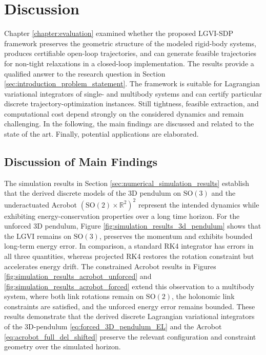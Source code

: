 \chapter{Discussion}
\label{chap:discussion}

Chapter \ref{chapter:evaluation} examined whether the proposed LGVI-SDP framework 
preserves the geometric structure
of the modeled rigid-body systems,
produces certifiable open-loop trajectories,
and can generate feasible trajectories for non-tight relaxations in a closed-loop implementation.
The results provide a qualified answer to the research question in Section \ref{sec:introduction_problem_statement}.
The framework is suitable for Lagrangian variational integrators of single- and multibody systems
and can certify particular discrete trajectory-optimization instances.
Still tightness, feasible extraction,
and computational cost depend strongly on the considered dynamics and remain challenging.
In the following, the main findings are discussed and related to the state of the art.
Finally, potential applications are elaborated.

\section{Discussion of Main Findings}
\label{sec:discussion_of_main_findings}
The simulation results in Section \ref{sec:numerical_simulation_results} 
establish that the derived discrete models of the 
3D pendulum on $\mathrm{SO}(3)$ and the underactuated Acrobot $(\mathrm{SO}(2) \times \mathbb{R}^2)^2$
represent the intended dynamics while exhibiting energy-conservation properties over a long time horizon.
For the unforced 3D pendulum,
Figure \ref{fig:simulation_results_3d_pendulum} shows that the LGVI remains on $\mathrm{SO}(3)$,
preserves the momentum
and exhibits bounded long-term energy error.
In comparison, a standard RK4 integrator has errors in all three quantities,
whereas projected RK4 restores the rotation constraint but accelerates energy drift.
The constrained Acrobot results in Figures \ref{fig:simulation_results_acrobot_unforced} 
and \ref{fig:simulation_results_acrobot_forced} extend this observation to a multibody system,
where both link rotations remain on $\mathrm{SO}(2)$,
the holonomic link constraints are satisfied,
and the unforced energy error remains bounded.
These results demonstrate that the derived discrete Lagrangian variational 
integrators of the 3D-pendulum \eqref{eq:forced_3D_pendulum_EL} and the 
Acrobot \eqref{eq:acrobot_full_del_shifted} preserve the relevant configuration 
and constraint geometry over the simulated horizon.


